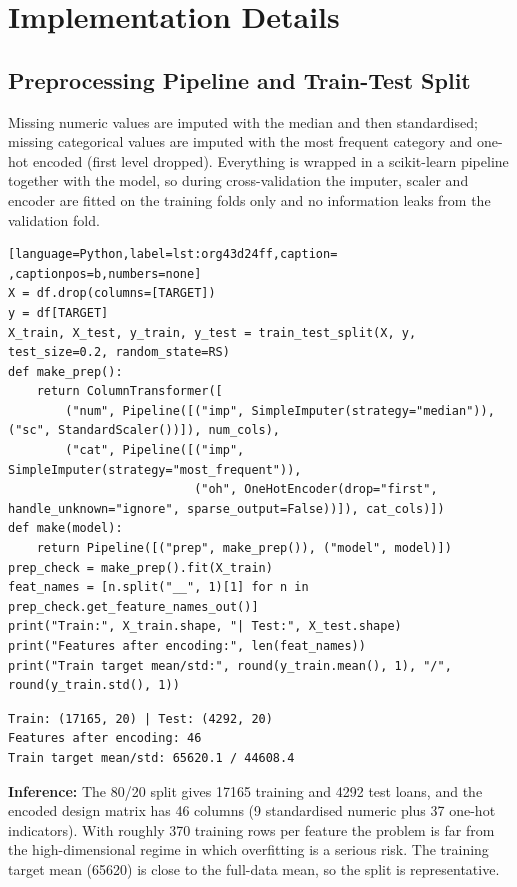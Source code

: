 \documentclass[11pt]{article}
\begin{document}
\section*{Implementation Details}
\label{sec:org255a5d7}


\subsection*{Preprocessing Pipeline and Train-Test Split}
\label{sec:org33597fd}


Missing numeric values are imputed with the median and then standardised; missing
categorical values are imputed with the most frequent category and one-hot encoded (first
level dropped). Everything is wrapped in a scikit-learn pipeline together with the model, so
during cross-validation the imputer, scaler and encoder are fitted on the training folds
only and no information leaks from the validation fold.
\begin{lstlisting}[language=Python,label=lst:org43d24ff,caption= ,captionpos=b,numbers=none]
X = df.drop(columns=[TARGET])
y = df[TARGET]
X_train, X_test, y_train, y_test = train_test_split(X, y, test_size=0.2, random_state=RS)
def make_prep():
    return ColumnTransformer([
        ("num", Pipeline([("imp", SimpleImputer(strategy="median")), ("sc", StandardScaler())]), num_cols),
        ("cat", Pipeline([("imp", SimpleImputer(strategy="most_frequent")),
                          ("oh", OneHotEncoder(drop="first", handle_unknown="ignore", sparse_output=False))]), cat_cols)])
def make(model):
    return Pipeline([("prep", make_prep()), ("model", model)])
prep_check = make_prep().fit(X_train)
feat_names = [n.split("__", 1)[1] for n in prep_check.get_feature_names_out()]
print("Train:", X_train.shape, "| Test:", X_test.shape)
print("Features after encoding:", len(feat_names))
print("Train target mean/std:", round(y_train.mean(), 1), "/", round(y_train.std(), 1))
\end{lstlisting}

\begin{verbatim}
Train: (17165, 20) | Test: (4292, 20)
Features after encoding: 46
Train target mean/std: 65620.1 / 44608.4
\end{verbatim}


\textbf{Inference:} The 80/20 split gives 17165 training and 4292 test loans, and the encoded design matrix has
46 columns (9 standardised numeric plus 37 one-hot indicators). With roughly 370 training
rows per feature the problem is far from the high-dimensional regime in which overfitting is
a serious risk. The training target mean (65620) is close to the full-data mean, so the
split is representative.
\end{document}
